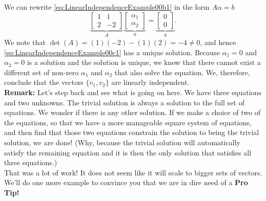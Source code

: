 We can rewrite \eqref{eq:LinearIndependenceExample00b1} in the form $A \alpha=b$
\begin{equation}
\label{eq:LinearIndependenceExample00c1}
   \underbrace{\left[ \begin{array}{rr} 1 & 1\\2 & -2 \end{array} \right]}_{A} 
\underbrace{\left[ \begin{array}{c} \alpha_1 \\ \alpha_2 \end{array} \right]}_{\alpha} =  \underbrace{ \left[ \begin{array}{r} 0 \\ 0 \end{array} \right]}_{b}.
\end{equation}
We note that $\det(A) = (1)(-2)-(1)(2) = -4 \neq 0$, and hence \eqref{eq:LinearIndependenceExample00c1} has a unique solution. Because $\alpha_1=0$ and $\alpha_2=0$ is a solution and the solution is unique, we know that there cannot exist a different set of non-zero  $\alpha_1$ and $\alpha_2$ that also solve the equation. We, therefore, conclude that the vectors $\{v_1, v_2\}$ are linearly independent. \\

\textbf{Remark:} Let's step back and see what is going on here. We have three equations and two unknowns. The trivial  solution is always a solution to the full set of equations. We wonder if there is any other solution. If we make a choice of two of the equations, so that we have a more manageable square system of equations, and then find that those two equations constrain the solution to being the trivial solution, we are done! (Why, because the trivial solution will automatically satisfy the remaining equation and it is then the only solution that satisfies all three equations.)
 \Qed\\
 
 
That was a lot of work! It does not seem like it will scale to bigger sets of vectors.  We'll do one more example to convince you that we are in dire need of a \textbf{Pro Tip!}

\vspace*{0.5cm}

